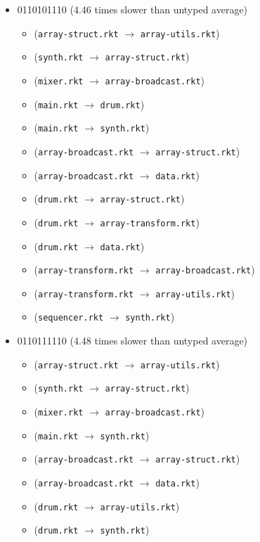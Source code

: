 \documentclass{article}
\newcommand{\mono}[1]{\texttt{#1}}
\begin{document}
\begin{itemize}
\begin{itemize}
  \end{itemize}
\item 0110101110 (4.46 times slower than untyped average)
  \begin{itemize}
  \item (\mono{array-struct.rkt} $\rightarrow$ \mono{array-utils.rkt})
  \item (\mono{synth.rkt} $\rightarrow$ \mono{array-struct.rkt})
  \item (\mono{mixer.rkt} $\rightarrow$ \mono{array-broadcast.rkt})
  \item (\mono{main.rkt} $\rightarrow$ \mono{drum.rkt})
  \item (\mono{main.rkt} $\rightarrow$ \mono{synth.rkt})
  \item (\mono{array-broadcast.rkt} $\rightarrow$ \mono{array-struct.rkt})
  \item (\mono{array-broadcast.rkt} $\rightarrow$ \mono{data.rkt})
  \item (\mono{drum.rkt} $\rightarrow$ \mono{array-struct.rkt})
  \item (\mono{drum.rkt} $\rightarrow$ \mono{array-transform.rkt})
  \item (\mono{drum.rkt} $\rightarrow$ \mono{data.rkt})
  \item (\mono{array-transform.rkt} $\rightarrow$ \mono{array-broadcast.rkt})
  \item (\mono{array-transform.rkt} $\rightarrow$ \mono{array-utils.rkt})
  \item (\mono{sequencer.rkt} $\rightarrow$ \mono{synth.rkt})
  \end{itemize}
\item 0110111110 (4.48 times slower than untyped average)
  \begin{itemize}
  \item (\mono{array-struct.rkt} $\rightarrow$ \mono{array-utils.rkt})
  \item (\mono{synth.rkt} $\rightarrow$ \mono{array-struct.rkt})
  \item (\mono{mixer.rkt} $\rightarrow$ \mono{array-broadcast.rkt})
  \item (\mono{main.rkt} $\rightarrow$ \mono{synth.rkt})
  \item (\mono{array-broadcast.rkt} $\rightarrow$ \mono{array-struct.rkt})
  \item (\mono{array-broadcast.rkt} $\rightarrow$ \mono{data.rkt})
  \item (\mono{drum.rkt} $\rightarrow$ \mono{array-utils.rkt})
  \item (\mono{drum.rkt} $\rightarrow$ \mono{synth.rkt})

\end{itemize}
\end{itemize}
\end{document}
